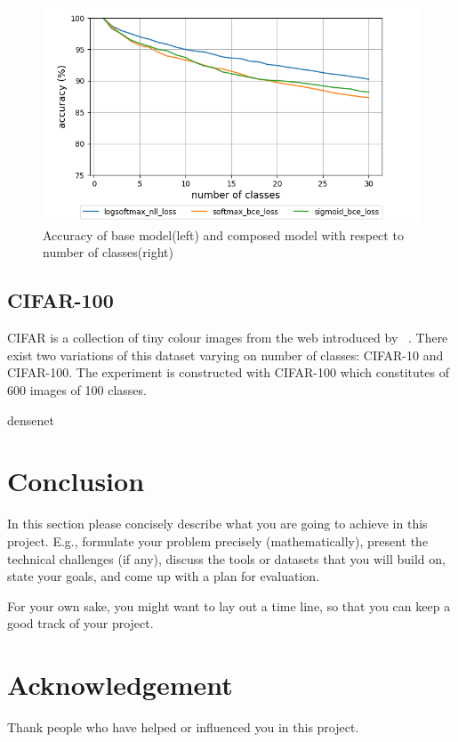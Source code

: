 \documentclass{article}
\begin{document}
\begin{figure}[t]
    \centering
    \includegraphics[scale=0.5,trim={0mm 0mm 0mm 0mm},clip]{kws.png}
    \caption{Accuracy of base model(left) and composed model with respect to number of classes(right)}
    \label{figure:composed_kws}
\end{figure}

\subsection{CIFAR-100}

CIFAR is a collection of tiny colour images from the web introduced by ~\cite{krizhevsky2009learning}. There exist two variations of this dataset varying on number of classes: CIFAR-10 and CIFAR-100. The experiment is constructed with CIFAR-100 which constitutes of 600 images of 100 classes.


densenet ~\cite{huang2017densely}

\section{Conclusion}
In this section please concisely describe what you are going to achieve in this project. E.g., formulate your problem precisely (mathematically), present the technical challenges (if any), discuss the tools or datasets that you will build on, state your goals, and come up with a plan for evaluation.

For your own sake, you might want to lay out a time line, so that you can keep a good track of your project.

\newpage

\section*{Acknowledgement}
Thank people who have helped or influenced you in this project.

\nocite{*}



\end{document}
